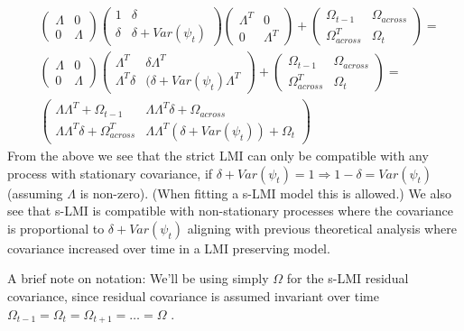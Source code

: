 \documentclass[
  letterpaper,
  DIV=11,
  numbers=noendperiod]{scrartcl}
\begin{document}
\[
\begin{align*}&\begin{pmatrix}    \Lambda & 0\\   0 & \Lambda \end{pmatrix} \begin{pmatrix}   1 & \delta \\   \delta & \delta+Var(\psi_t) \end{pmatrix} \begin{pmatrix}    \Lambda^T & 0\\   0 & \Lambda^T \end{pmatrix}+ \begin{pmatrix}   \Omega_{t-1} & \Omega_{across} \\   \Omega_{across}^T & \Omega_t \end{pmatrix} =\\
&\begin{pmatrix}    \Lambda & 0\\   0 & \Lambda \end{pmatrix} \begin{pmatrix}    \Lambda^T & \delta\Lambda^T\\   \Lambda^T\delta & (\delta+Var(\psi_t)\Lambda^T \end{pmatrix} + 
\begin{pmatrix}   
\Omega_{t-1} & \Omega_{across} \\   
\Omega_{across}^T & \Omega_t \end{pmatrix}=\\
& \begin{pmatrix}    
\Lambda\Lambda^T + \Omega_{t-1}& \Lambda\Lambda^T\delta + \Omega_{across}\\   
\Lambda\Lambda^T\delta + \Omega_{across}^T & \Lambda\Lambda^T(\delta+Var(\psi_t)) + \Omega_t 
\end{pmatrix} 
\end{align*}
\] From the above we see that the strict LMI can only be compatible with
any process with stationary covariance, if
\(\delta+Var(\psi_t)=1\Rightarrow1-\delta=Var(\psi_t)\) (assuming
\(\Lambda\) is non-zero). (When fitting a s-LMI model this is allowed.)
We also see that s-LMI is compatible with non-stationary processes where
the covariance is proportional to \(\delta+Var(\psi_t)\) aligning with
previous theoretical analysis where covariance increased over time in a
LMI preserving model.

A brief note on notation: We'll be using simply \(\Omega\) for the s-LMI
residual covariance, since residual covariance is assumed invariant over
time \(\Omega_{t-1}=\Omega_{t}=\Omega_{t+1}=…=\Omega\) .
\end{document}
